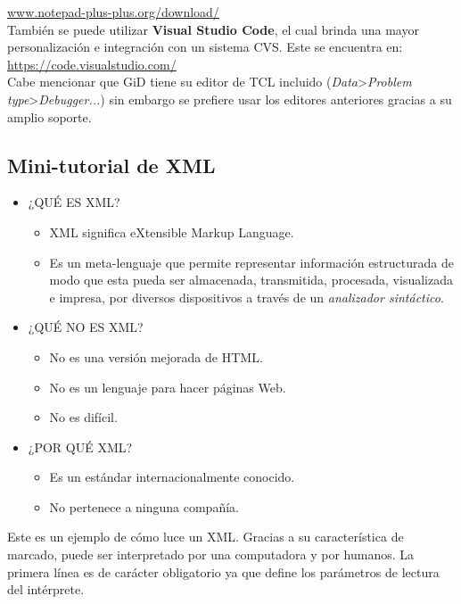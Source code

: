 \documentclass[10pt, a4paper, twocolumn]{article}
\begin{document}
\textcolor{BlueGiD}{\underline{\url{www.notepad-plus-plus.org/download/}}}\\

También se puede utilizar \textbf{Visual Studio Code}, el cual brinda una mayor personalización e integración con un sistema CVS. Este se encuentra en:\\

\textcolor{BlueGiD}{\underline{\url{https://code.visualstudio.com/}}}\\

Cabe mencionar que GiD tiene su editor de TCL incluido (\textit{Data}>\textit{Problem type}>\textit{Debugger...}) sin embargo se prefiere usar los editores anteriores gracias a su amplio soporte.

\subsection{Mini-tutorial de XML}

\begin{itemize}
	\item ¿QUÉ ES XML?
		\begin{itemize}
			\item XML significa eXtensible Markup Language.
			\item Es un meta-lenguaje que permite representar información estructurada de modo que esta pueda ser almacenada, transmitida, procesada, visualizada e impresa, por diversos dispositivos a través de un \textit{analizador sintáctico}.
		\end{itemize}
	\item ¿QUÉ NO ES XML?
		\begin{itemize}
			\item No es una versión mejorada de HTML.
			\item No es un lenguaje para hacer páginas Web.
			\item No es difícil.
		\end{itemize}
		\newpage
	\item ¿POR QUÉ XML?
		\begin{itemize}
			\item Es un estándar internacionalmente conocido.
			\item No pertenece a ninguna compañía.
		\end{itemize}
\end{itemize}

Este es un ejemplo de cómo luce un XML. Gracias a su característica de marcado, puede ser interpretado por una computadora y por humanos. La primera línea es de carácter obligatorio ya que define los parámetros de lectura del intérprete.
\end{document}
